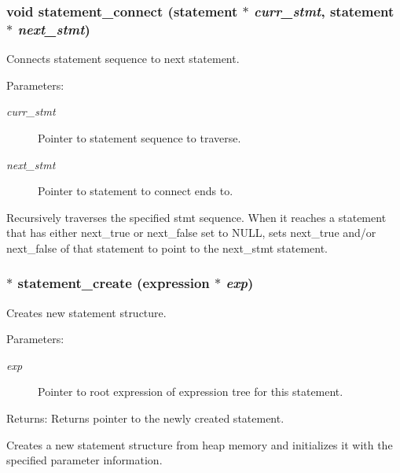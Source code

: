\subsubsection{\setlength{\rightskip}{0pt plus 5cm}void statement\_\-connect ({\bf statement} $\ast$ {\em curr\_\-stmt}, {\bf statement} $\ast$ {\em next\_\-stmt})}\label{statement_8c_a7}


Connects statement sequence to next statement.

\begin{Desc}
\item[Parameters:]
\begin{description}
\item[{\em curr\_\-stmt}]Pointer to statement sequence to traverse. \item[{\em next\_\-stmt}]Pointer to statement to connect ends to.\end{description}
\end{Desc}
Recursively traverses the specified stmt sequence. When it reaches a statement that has either next\_\-true or next\_\-false set to NULL, sets next\_\-true and/or next\_\-false of that statement to point to the next\_\-stmt statement. 
\subsubsection{$\ast$ statement\_\-create ({\bf expression} $\ast$ {\em exp})}\label{statement_8c_a2}


Creates new statement structure.

\begin{Desc}
\item[Parameters:]
\begin{description}
\item[{\em exp}]Pointer to root expression of expression tree for this statement.\end{description}
\end{Desc}
\begin{Desc}
\item[Returns:]Returns pointer to the newly created statement.\end{Desc}
Creates a new statement structure from heap memory and initializes it with the specified parameter information. 
